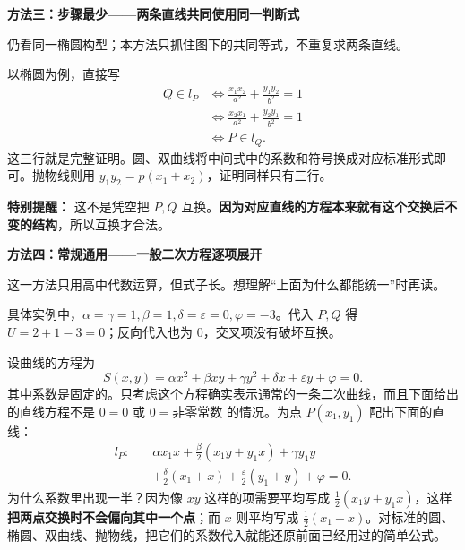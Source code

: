 \begin{proofbox}
\medskip
\textbf{\textcolor{CProof}{方法三：步骤最少——两条直线共同使用同一判断式}}


\begin{center}

\end{center}
仍看同一椭圆构型；本方法只抓住图下的共同等式，不重复求两条直线。

以椭圆为例，直接写
\[
\begin{aligned}
Q\in l_P
&\iff \frac{x_1x_2}{a^2}+\frac{y_1y_2}{b^2}=1\\
&\iff \frac{x_2x_1}{a^2}+\frac{y_2y_1}{b^2}=1\\
&\iff P\in l_Q.
\end{aligned}
\]
这三行就是完整证明。圆、双曲线将中间式中的系数和符号换成对应标准形式即可。抛物线则用 $y_1y_2=p(x_1+x_2)$，证明同样只有三行。

\textbf{特别提醒：} 这不是凭空把 $P,Q$ 互换。\textbf{因为对应直线的方程本来就有这个交换后不变的结构}，所以互换才合法。

\medskip
\par\noindent\begin{minipage}{\linewidth}
\textbf{\textcolor{CProof}{方法四：常规通用——一般二次方程逐项展开}}

这一方法只用高中代数运算，但式子长。想理解“上面为什么都能统一”时再读。


\begin{center}

\end{center}
\end{minipage}\par
具体实例中，$\alpha=\gamma=1,\beta=1,\delta=\varepsilon=0,\varphi=-3$。代入 $P,Q$ 得 $U=2+1-3=0$；反向代入也为 $0$，交叉项没有破坏互换。

设曲线的方程为
\[
S(x,y)=\alpha x^2+\beta xy+\gamma y^2+\delta x+\varepsilon y+\varphi=0.
\]
其中系数是固定的。只考虑这个方程确实表示通常的一条二次曲线，而且下面给出的直线方程不是 $0=0$ 或 $0=\text{非零常数}$ 的情况。为点 $P(x_1,y_1)$ 配出下面的直线：
\[
\begin{aligned}
l_P:\quad &\alpha x_1x+\frac{\beta}{2}(x_1y+y_1x)+\gamma y_1y\\
&+\frac{\delta}{2}(x_1+x)+\frac{\varepsilon}{2}(y_1+y)+\varphi=0.
\end{aligned}
\]
为什么系数里出现一半？因为像 $xy$ 这样的项需要平均写成 $\frac12(x_1y+y_1x)$，这样\textbf{把两点交换时不会偏向其中一个点}；而 $x$ 则平均写成 $\frac12(x_1+x)$。对标准的圆、椭圆、双曲线、抛物线，把它们的系数代入就能还原前面已经用过的简单公式。


\end{proofbox}

